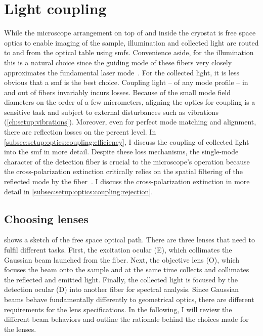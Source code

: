 \section{Light coupling}\label{sec:setup:optics:coupling}
While the microscope arrangement on top of and inside the cryostat is free space optics to enable imaging of the sample, illumination and collected light are routed to and from the optical table using \glspl{smf}.
Convenience aside, for the illumination this is a natural choice since the guiding mode of these fibers very closely approximates the fundamental  laser mode~\cite{Kowalevicz2006}.
For the collected light, it is less obvious that a \gls{smf} is the best choice.
Coupling light -- of any mode profile -- in and out of fibers invariably incurs losses.
Because of the small mode field diameters on the order of a few micrometers, aligning the optics for coupling is a sensitive task and subject to external disturbances such as vibrations (\cf \cref{ch:setup:vibrations}).
Moreover, even for perfect mode matching and alignment, there are reflection losses on the percent level.
In \cref{subsec:setup:optics:coupling:efficiency}, I discuss the coupling of collected light into the \gls{smf} in more detail.
Despite these loss mechanisms, the single-mode character of the detection fiber is crucial to the microscope's operation because the cross-polarization extinction critically relies on the spatial filtering of the reflected mode by the fiber~\cite{Benelajla2021,Steindl2023}.
I discuss the cross-polarization extinction in more detail in \cref{subsec:setup:optics:coupling:rejection}.

\subsection{Choosing lenses}\label{subsec:setup:optics:coupling:lenses}
 shows a sketch of the free space optical path.
There are three lenses that need to fulfil different tasks.
First, the excitation ocular (E), which collimates the Gaussian beam launched from the fiber.
Next, the objective lens (O), which focuses the beam onto the sample and at the same time collects and collimates the reflected and emitted light.
Finally, the collected light is focused by the detection ocular (D) into another fiber for spectral analysis.
Since Gaussian beams behave fundamentally differently to geometrical optics, there are different requirements for the lens specifications.
In the following, I will review the different beam behaviors and outline the rationale behind the choices made for the lenses.

